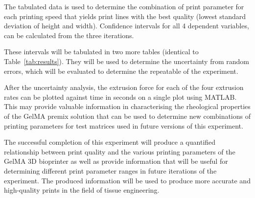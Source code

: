 The tabulated data is used to determine the combination of print parameter for each printing speed that yields print lines with the best quality (lowest standard deviation of height and width). Confidence intervals for all 4 dependent variables, can be calculated from the three iterations.

These intervals will be tabulated in two more tables (identical to Table~\ref{tab:results}). They will be used to determine the uncertainty from random errors, which will be evaluated to determine the repeatable of the experiment.

After the uncertainty analysis, the extrusion force for each of the four extrusion rates can be plotted against time in seconds on a single plot using MATLAB. This may provide valuable information in characterising the rheological properties of the GelMA premix solution that can be used to determine new combinations of printing parameters for test matrices used in future versions of this experiment.

The successful completion of this experiment will produce a quantified relationship between print quality and the various printing parameters of the GelMA 3D bioprinter as well as provide information that will be useful for determining different print parameter ranges in future iterations of the experiment. The produced information will be used to produce more accurate and high-quality prints in the field of tissue engineering.